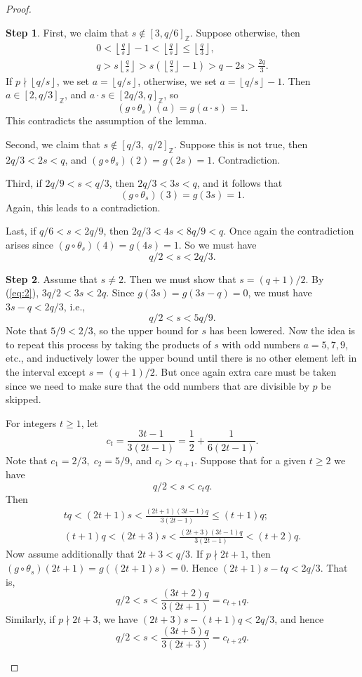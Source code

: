 \documentclass{amsart}[11pt]
\theoremstyle{definition}
\newtheorem{step}{Step}
\numberwithin{equation}{section}
\theoremstyle{notitle}
\begin{document}
\begin{proof}
\begin{step}
    First, we claim that $s\not\in [3, q/6]_{\mathbb{Z}}$. Suppose otherwise,
    then
\begin{gather*}
  0<{\left\lfloor {\frac{q}{s}} \right\rfloor}-1<{\left\lfloor {\frac{q}{s}} \right\rfloor}\leq {\left\lfloor {\frac{q}{3}} \right\rfloor},\\
  q> s{\left\lfloor {\frac{q}{s}} \right\rfloor}> s
  \left({\left\lfloor {\frac{q}{s}} \right\rfloor}-1\right)> q-2s >
  \frac{2q}{3}.
\end{gather*}
If $p\nmid {\left\lfloor {q/s} \right\rfloor}$, we set $a={\left\lfloor {q/s} \right\rfloor}$, otherwise, we set
$a={\left\lfloor {q/s} \right\rfloor}-1$. Then $a\in [2, q/3]_{\mathbb{Z}}$, and $a\cdot s\in [2q/3, q]_{\mathbb{Z}}$,
so
\[ (g\circ \theta_s)(a)=g(a\cdot s)= 1.\] This
contradicts the assumption of the lemma.

Second, we claim that $s\not\in [q/3,\; q/2]_{\mathbb{Z}}$. Suppose this
is not true, then $ 2q/3<2s<q$, and
$(g\circ\theta_s)(2)=g(2s)=1$. Contradiction. 

Third, if $2q/9<s<q/3$, then $2q/3<3s<q$, and it follows that
\[ (g\circ\theta_s)(3)=g(3s)=1.\] Again, this leads to a
contradiction. 

Last, if $q/6<s<2q/9$, then $2q/3<4s<8q/9<q$. Once again the
contradiction arises since $(g\circ\theta_s)(4)=g(4s)=1$. So we must
have
\begin{equation}
  \label{eq:2}
  q/2 < s < 2q/3.
\end{equation}
  \end{step}
  \begin{step}
    Assume that $s\neq 2$. Then we must show that $s=(q+1)/2$. By
     (\ref{eq:2}), $3q/2< 3s < 2q$.  Since $g(3s)=g(3s-q)=0$,
    we must have $3s-q<2q/3$, i.e.,
\begin{equation}
  \label{eq:3}
 q/2< s < 5q/9. 
\end{equation}
Note that $5/9< 2/3$, so the upper bound for $s$ has been lowered.
Now the idea is to repeat this process by taking the products of $s$
with odd numbers $a=5, 7, 9$, etc., and inductively lower the upper
bound until there is no other element left in the interval except
$s=(q+1)/2$.  But once again extra care must be taken since we need to
make sure that the odd numbers that are divisible by $p$ be skipped.

For integers $t\geq 1$, let
\[c_t= \frac{3t-1}{3(2t-1)}=\frac{1}{2}+\frac{1}{6(2t-1)}.\] Note that
$c_1=2/3,\; c_2=5/9$, and $c_t>c_{t+1}$. Suppose that for a given
$t\geq 2$ we have \[ q/2< s < c_t q.\] Then 
\begin{gather*}
   tq < (2t+1)s <
\frac{(2t+1)(3t-1)q}{3(2t-1)}\leq (t+1)q;\\
   (t+1)q < (2t+3)s < \frac{(2t+3)(3t-1)q}{3(2t-1)}< (t+2)q.
\end{gather*}
Now assume additionally that $2t+3<q/3$. If $p\nmid 2t+1$, then
$(g\circ\theta_s)(2t+1)=g((2t+1)s)=0$. Hence $(2t+1)s-tq < 2q/3$. That is,
\[q/2<s < \frac{(3t+2)q}{3(2t+1)}= c_{t+1}q.\] Similarly, if $p\nmid
2t+3$, we have $(2t+3)s-(t+1)q<2q/3$, and hence
\[q/2<s < \frac{(3t+5)q}{3(2t+3)}= c_{t+2}q.\]


\end{step}
\end{proof}
\end{document}
